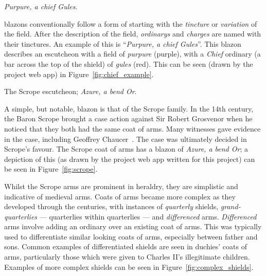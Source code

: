 \documentclass[nobib, a4paper, twoside, justified]{tufte-book}
\makeatletter
\newcommand{\charges}{\glspl{charge}\@\xspace}
\newcommand{\blazon}{\gls{blazon}\@\xspace}
\newcommand{\ublazons}{\Glspl{blazon}\@\xspace}
\makeatother
\begin{document}
\begin{marginfigure}
  \centering
  \def\svgwidth{0.8\linewidth}
  
  \caption{\textit{Purpure, a chief Gules}.}%
  \label{fig:chief_example}
\end{marginfigure}

\ublazons conventionally follow a form of starting with the \textit{\gls{tincture}} or
\textit{\gls{variation}} of the field. After the description of the field,
\textit{\glspl{ordinary}} and \textit{\charges} are named with their tinctures. An example of
this is ``\textit{Purpure, a chief Gules}''. This \blazon describes an escutcheon with a field of
\textit{purpure} (purple), with a \textit{Chief} \gls{ordinary} (a bar across the top of the
shield) of \textit{gules} (red). This can be seen (drawn by the project web app) in
Figure~\ref{fig:chief_example}.

\begin{marginfigure}
  \centering
  \def\svgwidth{0.8\linewidth}
  
  \caption{The Scrope \gls{escutcheon}; \textit{Azure, a bend Or}.}%
  \label{fig:scrope}
\end{marginfigure}

A simple, but notable, \blazon is that of the Scrope family. In the 14th century, the Baron Scrope
brought a case action against Sir Robert Grosvenor when he noticed that they both had the same coat
of arms. Many witnesses gave evidence in the case, including Geoffrey
Chaucer~\autocite{scrope_grosvenor}. The case was ultimately decided in Scrope's favour. The Scrope
coat of arms has a \blazon of \textit{Azure, a bend Or}; a depiction of this (as drawn by the
project web app written for this project) can be seen in Figure~\ref{fig:scrope}.

Whilst the Scrope arms are prominent in heraldry, they are simplistic and indicative of
medieval arms. Coats of arms became more complex as they developed through the centuries, with
instances of \textit{quarterly} shields, \textit{grand-quarterlies} --- quarterlies within
quarterlies --- and \textit{differenced} arms. \textit{Differenced} arms involve adding an
\gls{ordinary} over an existing coat of arms. This was typically used to differentiate similar
looking coats of arms, especially between father and sons. Common examples of differentiated
shields are seen in duchies' coats of arms, particularly those which were given to Charles II's
illegitimate children. Examples of more complex shields can be seen in
Figure~\ref{fig:complex_shields}.
\end{document}
